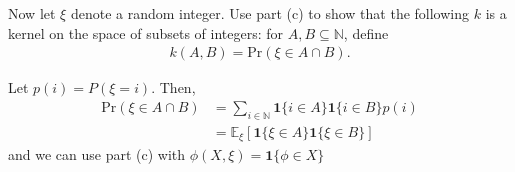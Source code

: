 \begin{Parts}
\begin{solution}
\end{solution}

\Part 
Now let $\xi$ denote a random integer. Use part (c) to show that the following $k$ is a kernel on the space of subsets of integers: for $A,B \subseteq \mathbb{N}$, define 
\begin{align}
    k(A,B)= \text{Pr}(\xi \in A \cap B).
\end{align}

\begin{solution}
 Let $p(i) = P(\xi = i)$. Then,
 \begin{align}
     \text{Pr} (\xi \in A \cap B) &= \sum\limits_{i \in \mathbb{N}} \textbf{1}\{i\in A\}\textbf{1}\{i\in B\}p(i) \\
     &= \mathbb{E}_\xi \left[ \textbf{1}\{\xi\in A\}\textbf{1}\{\xi\in B\} \right] 
 \end{align}
 and we can use part (c) with $\phi(X, \xi) = \textbf{1}\{\phi \in X\}$
\end{solution}

\end{Parts}
